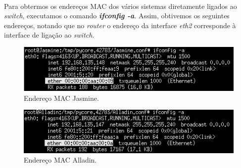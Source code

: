     \paragraph{}
    \par Para obtermos os endereços MAC dos vários sistemas diretamente ligados ao \textit{switch}, executamos o comando \textit{\textbf{ifconfig -a}}. Assim, obtivemos os seguintes endereços, notando que no \textit{router} o endereço da interface \textit{eth2} corresponde à interface de ligação ao \textit{switch}.

    \begin{minipage}{0.5\linewidth}
        \centering
            \begin{figure}[H]
            \includegraphics[width=\linewidth]{prints/Questao5/Jasmine.jpg}
            \caption{Endereço MAC Jasmine.} \label{questao5-MAC-Jasmine}
            \end{figure}
    \end{minipage}
    \begin{minipage}{0.5\linewidth}
        \centering
            \begin{figure}[H]
            \includegraphics[width=\linewidth]{prints/Questao5/Alladin.jpg}
            \caption{Endereço MAC Alladin.} \label{questao5-MAC-Alladin}
            \end{figure}
    \end{minipage}
    
